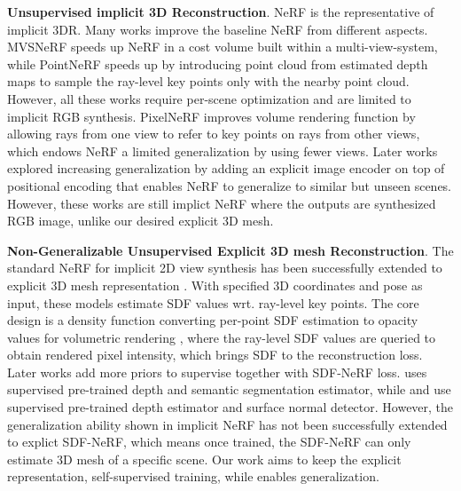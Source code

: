 \noindent
\textbf{Unsupervised implicit 3D Reconstruction}. NeRF \cite{nerf} is the representative of implicit 3DR. Many works \cite{mvsnerf, pointnerf, pixelnerf, nsvf, plenoxels, instant, blocknerf, nerfusion} improve the baseline NeRF from different aspects. MVSNeRF \cite{mvsnerf} speeds up NeRF in a cost volume built within a multi-view-system, while PointNeRF \cite{pointnerf} speeds up by introducing point cloud from estimated depth maps to sample the ray-level key points only with the nearby point cloud. However, all these works require per-scene optimization and are limited to implicit RGB synthesis. PixelNeRF \cite{pixelnerf} improves volume rendering function by allowing rays from one view to refer to key points on rays from other views, which endows NeRF a limited generalization by using fewer views. Later works \cite{mpi-nerf, ibrnerf} explored increasing generalization by adding an explicit image encoder on top of positional encoding that enables NeRF to generalize to similar but unseen scenes. However, these works are still implict NeRF where the outputs are synthesized RGB image, unlike our desired explicit 3D mesh.

\noindent
\textbf{Non-Generalizable Unsupervised Explicit 3D mesh Reconstruction}.
The standard NeRF for implicit 2D view synthesis has been successfully extended to explicit 3D mesh representation \cite{hnerf, isdf, manhattansdf, monosdf, volsdf, neuris, neus, neuralangelo, neuralwarp, unisurf}. With specified 3D coordinates and pose as input, these models estimate SDF values wrt. ray-level key points. The core design is a density function converting per-point SDF estimation to opacity values for volumetric rendering \cite{volsdf}, where the ray-level SDF values are queried to obtain rendered pixel intensity, which brings SDF to the reconstruction loss. Later works add more priors to supervise together with SDF-NeRF loss. \cite{manhattansdf} uses supervised pre-trained depth and semantic segmentation estimator, while \cite{monosdf} and \cite{neuris} use supervised pre-trained depth estimator and surface normal detector. However, the generalization ability shown in implicit NeRF has not been successfully extended to explict SDF-NeRF, which means once trained, the SDF-NeRF can only estimate 3D mesh of a specific scene. Our work aims to keep the explicit representation, self-supervised training, while enables generalization.

